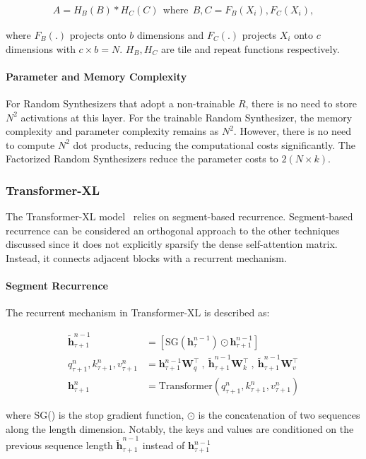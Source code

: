 \begin{align}
A=H_B(B)* H_C(C)  \:\: \text{where} \: \: B, C = F_B(X_i), F_C(X_i), 
\end{align}

where $F_B(.)$ projects onto $b$ dimensions and $F_C(.)$ projects $X_i$ onto $c$ dimensions with $c \times b=N$. $H_B,H_C$ are tile and repeat functions respectively.
\paragraph{Parameter and Memory Complexity} For Random Synthesizers that adopt a non-trainable $R$, there is no need to store $N^2$ activations at this layer. For the trainable Random Synthesizer, the memory complexity and parameter complexity remains as $N^2$. However, there is no need to compute $N^2$ dot products, reducing the computational costs significantly. The Factorized Random Synthesizers reduce the parameter costs to $2(N \times k)$.

\subsubsection{Transformer-XL} The Transformer-XL model~\citep{dai2019transformer} relies on segment-based recurrence. Segment-based recurrence can be considered an orthogonal approach to the other techniques discussed since it does not explicitly sparsify the dense self-attention matrix. Instead, it connects adjacent blocks with a recurrent mechanism. 

\paragraph{Segment Recurrence} The recurrent mechanism in Transformer-XL is described as:

\begin{align}
\tilde{\bm{h}}^{n-1}_{\tau+1} &= [\text{SG}(\bm{h}^{n-1}_{\tau}) \odot \bm{h}^{n-1}_{\tau +1}]   \\ 
q^{n}_{\tau+1}, k^{n}_{\tau+1}, v^{n}_{\tau+1} &= \bm{h}^{n-1}_{\tau+1}\bm{W}^\top_q \:,\: \tilde{\bm{h}}^{n-1}_{\tau+1}\bm{W}^\top_k \:,\: \tilde{\bm{h}}^{n-1}_{\tau+1}\bm{W}^\top_v \\ 
\bm{h}^{n}_{\tau+1} &= \text{Transformer}(q^{n}_{\tau+1}, k^{n}_{\tau+1}, v^{n}_{\tau+1})
\end{align}

where SG() is the stop gradient function, $\odot$ is the concatenation of two sequences along the length dimension. Notably, the keys and values are conditioned on the previous sequence length $\tilde{\bm{h}}^{n-1}_{\tau +1}$ instead of $\bm{h}^{n-1}_{\tau +1}$
